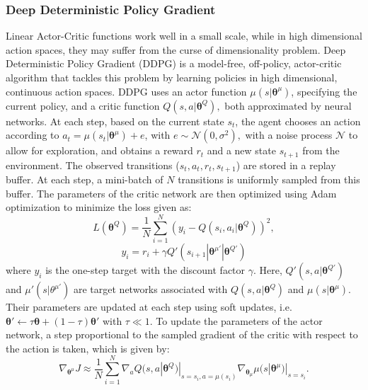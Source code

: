 \subsubsection{Deep Deterministic Policy Gradient}
Linear Actor-Critic functions work well in a small scale, while in high dimensional action spaces, they may suffer from the curse of dimensionality problem.
Deep Deterministic Policy Gradient (DDPG) is a model-free, off-policy, actor-critic algorithm that tackles this problem by learning policies in high dimensional, continuous action spaces. 
DDPG uses an actor function $\mu(s|\boldsymbol \theta^\mu)$, specifying the current policy, and a critic function $Q(s,a|\boldsymbol \theta^Q),$ both approximated by neural networks. At each step, based on the current state $s_t$, the agent chooses an action according to $a_t=\mu(s_t|\boldsymbol \theta^\mu) + e$,  with $e \sim \mathcal{N}(0,\sigma^2),$ with a noise process $\mathcal{N}$ to allow for exploration, and obtains a reward $r_t$ and a new state $s_{t+1}$ from the environment. The observed transitions ($s_t,a_t,r_t,s_{t+1}$) are stored in a replay buffer. At each step, a mini-batch of $N$ transitions is uniformly sampled from this buffer. The parameters of the critic network are then optimized using Adam optimization to minimize the loss given as: \begin{equation}L(\boldsymbol \theta^Q) = \frac{1}{N}\sum^N_{i=1}(y_i-Q(s_i,a_i|\boldsymbol \theta^Q))^2,\end{equation}
\begin{equation}y_i=r_i+\gamma Q'(s_{i+1}|\boldsymbol \theta^{\mu'}|\boldsymbol \theta^{Q'})\end{equation}
where $y_i$ is the one-step target with the discount factor $\gamma$. Here, $Q'(s,a|\boldsymbol \theta^{Q'})$ and $\mu'(s|\theta^{\mu'})$ are target networks associated with $Q(s,a|\boldsymbol \theta^Q)$ and $\mu(s|\boldsymbol \theta^\mu).$ Their parameters are updated at each step using soft updates, i.e. \(\boldsymbol \theta' \leftarrow \tau \boldsymbol \theta + (1-\tau)\boldsymbol \theta'\) with $\tau \ll 1.$ To update the parameters of the actor network, a step proportional to the sampled gradient of the critic with respect to the action is taken, which is given by: \begin{equation}\nabla_{\boldsymbol \theta^\mu}J\approx\frac{1}{N}\sum^N_{i=1}\nabla_aQ(s,a|\boldsymbol \theta^Q)|_{s=s_i,a=\mu(s_i)}\nabla_{\boldsymbol \theta_\mu}\mu(s|\boldsymbol \theta^\mu)|_{s=s_i}.\end{equation}

